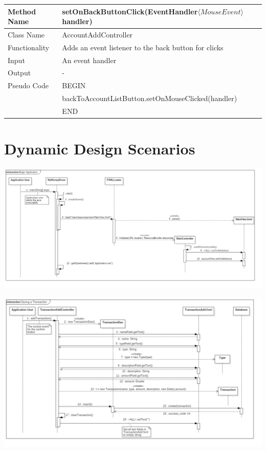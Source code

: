 \documentclass[12pt]{article}
\begin{document}
\begin{tabular}{ |p{3cm}||p{\colWidth}|  }
	\hline
	Method Name &  setOnBackButtonClick(EventHandler$\langle MouseEvent \rangle$ handler) \\
	\hline
	Class Name & AccountAddController\\
	\hline
	Functionality & Adds an event listener to the back button for clicks\\
	\hline
	Input & An event handler\\
	\hline
	Output & -\\
	\hline
	Pseudo Code 
	& BEGIN\\
	& 	backToAccountListButton.setOnMouseClicked(handler)\\
	& END\\
	\hline
\end{tabular} 


\section{Dynamic Design Scenarios}

\includegraphics[width=\graphicwidth]{images/Begin_Application.png}

\includegraphics[width=\graphicwidth]{images/Saving_a_Transaction.png}
\end{document}
